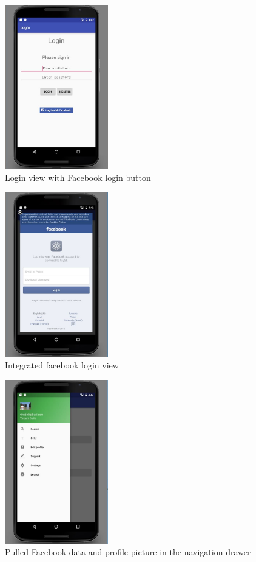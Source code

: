 \documentclass[11pt,twoside,a4paper]{report}
\begin{document}
\begin{appendices}
\begin{figure}
	\centering
	\includegraphics[width=0.4\textwidth]{jpg/facebook1.jpg}
	\caption{Login view with Facebook login button}
	\label{figure:navigation-drawer-in-start-view}
\end{figure}

\begin{figure}
	\centering
	\includegraphics[width=0.4\textwidth]{jpg/facebook2.jpg}
	\caption{Integrated facebook login view}
	\label{figure:search-view}
\end{figure}

\begin{figure}
	\centering
	\includegraphics[width=0.4\textwidth]{jpg/facebook3.jpg}
	\caption{Pulled Facebook data and profile picture in the navigation drawer}
	\label{figure:specify-search-view}
\end{figure}


\end{appendices}
\end{document}
